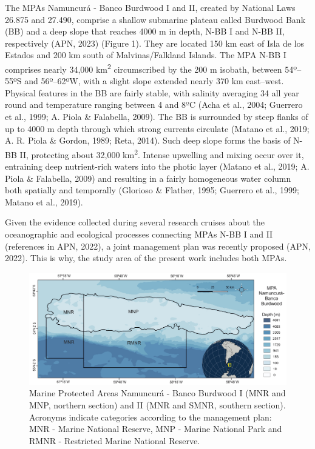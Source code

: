 \documentclass[preprint, 3p,
authoryear]{elsarticle} %
\begin{document}
The MPAs Namuncurá - Banco Burdwood I and II, created by National Laws
26.875 and 27.490, comprise a shallow submarine plateau called Burdwood
Bank (BB) and a deep slope that reaches 4000 m in depth, N-BB I and N-BB
II, respectively (APN, 2023) (Figure 1). They are located 150 km east of
Isla de los Estados and 200 km south of Malvinas/Falkland Islands. The
MPA N-BB I comprises nearly 34,000 km\textsuperscript{2} circumscribed
by the 200 m isobath, between 54º--55ºS and 56º--62ºW, with a slight
slope extended nearly 370 km east--west. Physical features in the BB are
fairly stable, with salinity averaging 34 all year round and temperature
ranging between 4 and 8ºC (Acha et al., 2004; Guerrero et al., 1999; A.
Piola \& Falabella, 2009). The BB is surrounded by steep flanks of up to
4000 m depth through which strong currents circulate (Matano et al.,
2019; A. R. Piola \& Gordon, 1989; Reta, 2014). Such deep slope forms
the basis of N-BB II, protecting about 32,000 km\textsuperscript{2}.
Intense upwelling and mixing occur over it, entraining deep
nutrient-rich waters into the photic layer (Matano et al., 2019; A.
Piola \& Falabella, 2009) and resulting in a fairly homogeneous water
column both spatially and temporally (Glorioso \& Flather, 1995;
Guerrero et al., 1999; Matano et al., 2019).

Given the evidence collected during several research cruises about the
oceanographic and ecological processes connecting MPAs N-BB I and II
(references in APN, 2022), a joint management plan was recently proposed
(APN, 2022). This is why, the study area of the present work includes
both MPAs.

\begin{figure}
\includegraphics[width=1\linewidth]{MPABurdwood_map} \caption{Marine Protected Areas Namuncurá - Banco Burdwood I (MNR and MNP, northern section) and II (MNR and SMNR, southern section). Acronyms indicate categories according to the management plan: MNR - Marine National Reserve, MNP - Marine National Park and RMNR - Restricted Marine National Reserve.}\label{fig:figure1}
\end{figure}
\end{document}

